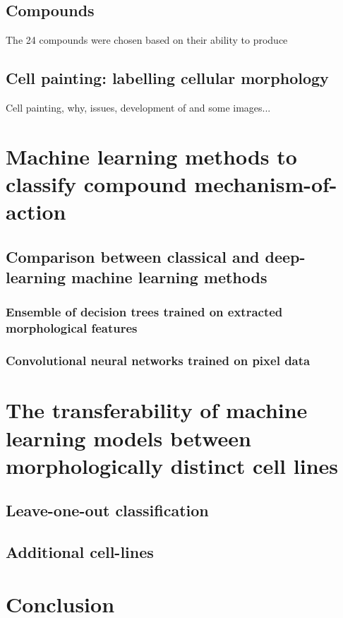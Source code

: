 \documentclass[a4paper,11pt,twoside,openright]{scrbook}
\begin{document}
\subsection{Compounds}
The 24 compounds were chosen based on their ability to produce


\subsection{Cell painting: labelling cellular morphology}
Cell painting, why, issues, development of and some images...

\section{Machine learning methods to classify compound mechanism-of-action}

\subsection{Comparison between classical and deep-learning machine learning methods}

\subsubsection{Ensemble of decision trees trained on extracted morphological features}

\subsubsection{Convolutional neural networks trained on pixel data}

\section{The transferability of machine learning models between morphologically distinct cell lines}

\subsection{Leave-one-out classification}

\subsection{Additional cell-lines}

\section{Conclusion}

\end{document}
